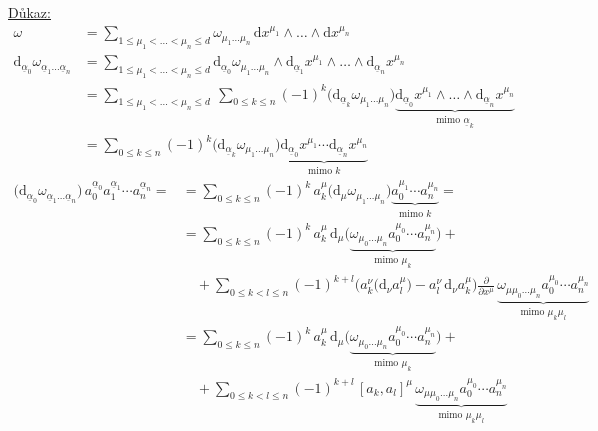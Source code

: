 \underline{Důkaz:}
\begin{align*}
  \omega &= \sum_{1\leq\mu_1<\dots<\mu_n\leq d}\omega_{\mu_1\dots\mu_n}\,\mathrm{d}x^{\mu_1}\wedge\dots\wedge\mathrm{d}x^{\mu_n} \\
  \mathrm{d}_{\underline{\alpha}_0}\omega_{\underline{\alpha}_1\dots\underline{\alpha}_n}
  &= \sum_{1\leq\mu_1<\dots<\mu_n\leq d}\mathrm{d}_{\underline{\alpha}_0}\omega_{\mu_1\dots\mu_n}\wedge\mathrm{d}_{\underline{\alpha}_1}x^{\mu_1}\wedge\dots\wedge\mathrm{d}_{\underline{\alpha}_n}x^{\mu_n} \\
  &= \sum_{1\leq\mu_1<\dots<\mu_n\leq d}\ \sum_{0\leq k\leq n}(-1)^k\big(\mathrm{d}_{\underline{\alpha}_k}\omega_{\mu_1\dots\mu_n}\big)\underbrace{\mathrm{d}_{\underline{\alpha}_0}x^{\mu_1}\wedge\dots\wedge\mathrm{d}_{\underline{\alpha}_n}x^{\mu_n}}_{\text{mimo } \underline{\alpha}_k} \\
  &= \sum_{0\leq k\leq n}(-1)^k\big(\mathrm{d}_{\underline{\alpha}_k}\omega_{\mu_1\dots\mu_n}\big)\underbrace{\mathrm{d}_{\underline{\alpha}_0}x^{\mu_1}\cdots\mathrm{d}_{\underline{\alpha}_n}x^{\mu_n}}_{\text{mimo } k}
\end{align*}
\begin{align*}
  \big(\mathrm{d}_{\underline{\alpha}_0}\omega_{\underline{\alpha}_1\dots\underline{\alpha}_n}\big)\,a_0^{\underline{\alpha}_0}a_1^{\underline{\alpha}_1}\cdots a_n^{\underline{\alpha}_n} =
  &= \sum_{0\leq k\leq n}(-1)^k\,a_k^\mu\big(\mathrm{d}_\mu\omega_{\mu_1\dots\mu_n}\big)\underbrace{a_0^{\mu_1}\cdots a_n^{\mu_n}}_{\text{mimo } k} = \\
  &= \sum_{0\leq k\leq n}(-1)^k\,a_k^\mu\,\mathrm{d}_\mu\Big(\underbrace{\omega_{\mu_0\dots\mu_n}a_0^{\mu_0}\cdots a_n^{\mu_n}}_{\text{mimo } \mu_k}\Big) + \\
  &\quad + \sum_{0\leq k<l\leq n}(-1)^{k+l}\Big(a_k^\nu\big(\mathrm{d}_\nu a_l^\mu\big) - a_l^\nu\,\mathrm{d}_\nu a_k^\mu\Big)\frac{\partial}{\partial x^\mu}\,\underbrace{\omega_{\mu\mu_0\dots\mu_n}a_0^{\mu_0}\cdots a_n^{\mu_n}}_{\text{mimo } \mu_k\mu_l} \\
  &= \sum_{0\leq k\leq n}(-1)^k\,a_k^\mu\,\mathrm{d}_\mu\Big(\underbrace{\omega_{\mu_0\dots\mu_n}a_0^{\mu_0}\cdots a_n^{\mu_n}}_{\text{mimo } \mu_k}\Big) + \\
  &\quad + \sum_{0\leq k<l\leq n}(-1)^{k+l}\,[a_k,a_l]^\mu\,\underbrace{\omega_{\mu\mu_0\dots\mu_n}a_0^{\mu_0}\cdots a_n^{\mu_n}}_{\text{mimo } \mu_k\mu_l}
\end{align*}

